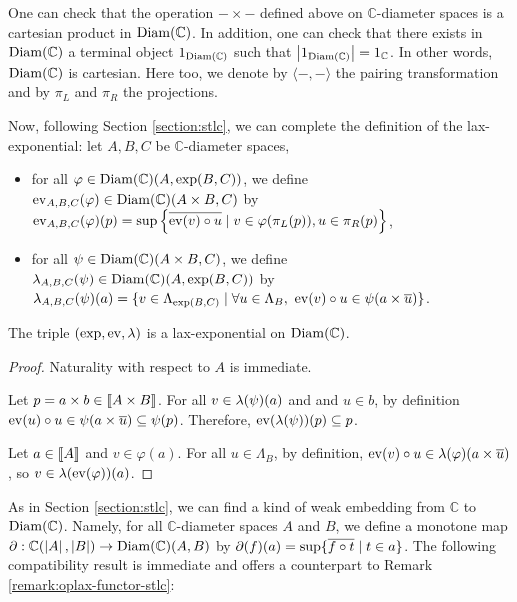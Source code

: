 One can check that the operation $-\times-$ defined above on $\mathbb{C}$-diameter spaces is a cartesian product in $\operatorname{Diam}(\mathbb{C})$. In addition, one can check that there exists in $\operatorname{Diam}(\mathbb{C})$ a terminal object $1_{\operatorname{Diam}(\mathbb{C})}$ such that $\left\vert1_{\operatorname{Diam}(\mathbb{C})}\right\vert = 1_{\mathbb{C}}$. In other words, $\operatorname{Diam}(\mathbb{C})$ is cartesian. Here too, we denote by $\langle-,-\rangle$ the pairing transformation and by $\pi_L$ and $\pi_R$ the projections.


Now, following Section \ref{section:stlc}, we can complete the definition of the lax-exponential: let $A,B,C$ be $\mathbb{C}$-diameter spaces, \begin{itemize}
\item for all $\varphi \in \operatorname{Diam}(\mathbb{C})(A, \exp(B, C))$, we define $\operatorname{ev}_{A,B,C}(\varphi) \in \operatorname{Diam}(\mathbb{C})\allowbreak(A \times B, C)$ by $\operatorname{ev}_{A,B,C}(\varphi)(p) = \sup\left\{ \overline{\operatorname{ev}(v) \circ u} \mid v \in \varphi(\pi_L(p)), u \in \pi_R(p) \right\}$,
\item for all $\psi \in \operatorname{Diam}(\mathbb{C})(A \times B, C)$, we define $\lambda_{A,B,C}(\psi) \in \operatorname{Diam}(\mathbb{C})(A,\allowbreak \exp(B, C))$ by $\lambda_{A,B,C}(\psi)(a) = \{ v \in \Lambda_{\exp(B, C)} \mid \forall u \in \Lambda_B,~ \operatorname{ev}(v) \circ u \in \psi(a \times \overline{u}) \}$.
\end{itemize}
 
 \begin{proposition} The triple $(\exp, \operatorname{ev}, \lambda)$ is a lax-exponential on $\operatorname{Diam}(\mathbb{C})$.
 \end{proposition}
 \begin{proof} Naturality with respect to $A$ is immediate.
 
Let $p = a \times b \in \llbracket A \times B \rrbracket$. For all $v \in \lambda(\psi)(a)$ and and $u \in b$, by definition $\operatorname{ev}(u) \circ u \in \psi(a \times \overline{u}) \subseteq \psi(p)$. Therefore, $\operatorname{ev}(\lambda(\psi))(p) \subseteq p$.
 
 Let $a \in \llbracket A \rrbracket$ and $v \in \varphi(a)$. For all $u \in \Lambda_B$,  by definition, $\operatorname{ev}(v) \circ u \in \lambda(\varphi)(a \times \overline{u})$, so $v \in \lambda(\operatorname{ev}(\varphi))(a)$.
\end{proof}
 
As in Section \ref{section:stlc}, we can find a kind of weak embedding from $\mathbb{C}$ to $\operatorname{Diam}(\mathbb{C})$. Namely, for all $\mathbb{C}$-diameter spaces $A$ and $B$, we define a monotone map $\partial : \mathbb{C}(\left\vert A\right\vert, \left\vert B\right\vert) \to \operatorname{Diam}\allowbreak(\mathbb{C})(A, B)$ by $\partial(f)(a) = \sup \{ \overline{f \circ t} \mid t \in a \}$. The following compatibility result is immediate and offers a counterpart to Remark \ref{remark:oplax-functor-stlc}:

